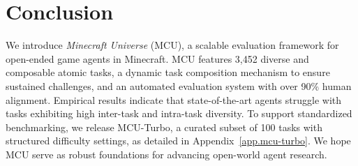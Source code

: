 
\section{Conclusion}

We introduce \textit{Minecraft Universe} (MCU), a scalable evaluation framework for open-ended game agents in Minecraft. MCU features 3,452 diverse and composable atomic tasks, a dynamic task composition mechanism to ensure sustained challenges, and an automated evaluation system with over 90\% human alignment. Empirical results indicate that state-of-the-art agents struggle with tasks exhibiting high inter-task and intra-task diversity. To support standardized benchmarking, we release MCU-Turbo, a curated subset of 100 tasks with structured difficulty settings, as detailed in Appendix~\ref{app.mcu-turbo}. We hope MCU serve as robust foundations for advancing open-world agent research.